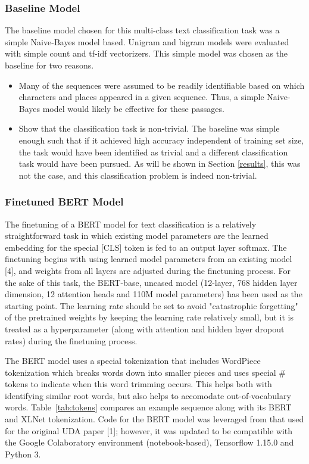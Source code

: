 \documentclass[twoside,twocolumn,10pt]{article}
\begin{document}
\subsubsection{Baseline Model}
The baseline model chosen for this multi-class text classification task was a simple Naive-Bayes model based. Unigram and bigram models were evaluated with simple count and tf-idf vectorizers. This simple model was chosen as the baseline for two reasons.
\begin{itemize}
 	\item Many of the sequences were assumed to be readily identifiable based on which characters and places appeared in a given sequence. Thus, a simple Naive-Bayes model would likely be effective for these passages.
 	\item Show that the classification task is non-trivial. The baseline was simple enough such that if it achieved high accuracy independent of training set size, the task would have been identified as trivial and a different classification task would have been pursued. As will be shown in Section \ref{results}, this was not the case, and this classification problem is indeed non-trivial. 
 \end{itemize}


\subsubsection{Finetuned BERT Model}

The finetuning of a BERT model for text classification is a relatively straightforward task in which existing model parameters are the learned embedding for the special [CLS] token is fed to an output layer softmax. The finetuning begins with using learned model parameters from an existing model [4], and weights from all layers are adjusted during the finetuning process. For the sake of this task, the BERT-base, uncased model (12-layer, 768 hidden layer dimension, 12 attention heads and 110M model parameters) has been used as the starting point. The learning rate should be set to avoid "catastrophic forgetting" of the pretrained weights by keeping the learning rate relatively small, but it is treated as a hyperparameter (along with attention and hidden layer dropout rates) during the finetuning process.

The BERT model uses a special tokenization that includes WordPiece tokenization \cite{Schuster and Nakajima:2012} which breaks words down into smaller pieces and uses special \# tokens to indicate when this word trimming occurs. This helps both with identifying similar root words, but also helps to accomodate out-of-vocabulary words. Table~\ref{tab:tokens} compares an example sequence along with its BERT and XLNet tokenization. Code for the BERT model was leveraged from that used for the original UDA paper [1]; however, it was updated to be compatible with the Google Colaboratory environment (notebook-based), Tensorflow 1.15.0 and Python 3.  
\end{document}
